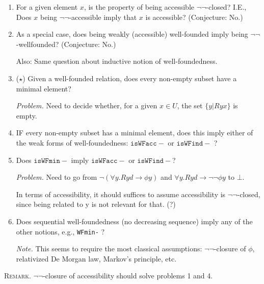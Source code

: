 \documentclass{scrartcl}
\begin{document}
\begin{enumerate}
  \item For a given element $x$, is the property of
  being accessible $\lnot\lnot$-closed? I.E.,
  Does $x$ being $\lnot\lnot$-accessible imply that $x$ is accessible?
  (Conjecture: No.)

  \item As a special case, does being weakly (accessible) well-founded imply being $\lnot\lnot$-wellfounded?
  (Conjecture: No.)

  Also: Same question about inductive notion of well-foundedness.

  \item ($\star$) Given a well-founded relation, does every non-empty subset
  have a minimal element?

  \emph{Problem.} Need to decide whether, for a given $x \in U$,
   the set $\{y | Ryx\}$ is empty.

   \item IF every non-empty subset has a minimal element, does this imply
   either of the weak forms of well-foundedness: $\mathtt{isWFacc-}$ or
   $\mathtt{isWFind-}$ ?

   \item Does $\mathtt{isWFmin-}$ imply $\mathtt{isWFacc-}$ or $\mathtt{isWFind-}$?

   \emph{Problem.} Need to go from $\lnot (\forall y. R y d \to \phi y)$
   and $\forall y. R y d \to \lnot \lnot \phi y$ to $\bot$.

   In terms of accessibility, it should suffices to assume accessibility is
   $\lnot\lnot$-closed, since being related to y is not relevant for that. (?)

   \item Does sequential well-foundedness (no decreasing sequence) imply
   any of the other notions, e.g., \texttt{WFmin-} ?

   \emph{Note.}  This seems to require the most classical assumptions:
   $\lnot\lnot$-closure of $\phi$, relativized De Morgan law,
   Markov's principle, etc.
\end{enumerate}

\textsc{Remark.}
$\lnot\lnot$-closure of accessibility should solve problems 1 and 4.
\end{document}
